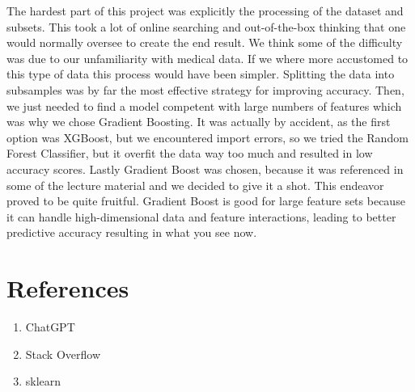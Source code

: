 \documentclass{article}
\begin{document}
The hardest part of this project was explicitly the processing of the dataset and subsets. This took a lot of online searching and out-of-the-box thinking that one would normally oversee to create the end result. We think some of the difficulty was due to our unfamiliarity with medical data. If we where more accustomed to this type of data this process would have been simpler. Splitting the data into subsamples was by far the most effective strategy for improving accuracy. Then, we just needed to find a model competent with large numbers of features which was why we chose Gradient Boosting. It was actually by accident, as the first option was XGBoost, but we encountered import errors, so we tried the Random Forest Classifier, but it overfit the data way too much and resulted in low accuracy scores. Lastly Gradient Boost was chosen, because it was referenced in some of the lecture material and we decided to give it a shot. This endeavor proved to be quite fruitful. Gradient Boost is good for large feature sets because it can handle high-dimensional data and feature interactions, leading to better predictive accuracy resulting in what you see now. 

\section{References}
\begin{enumerate}
    \item ChatGPT
    \item Stack Overflow
    \item sklearn
\end{enumerate}
\end{document}
